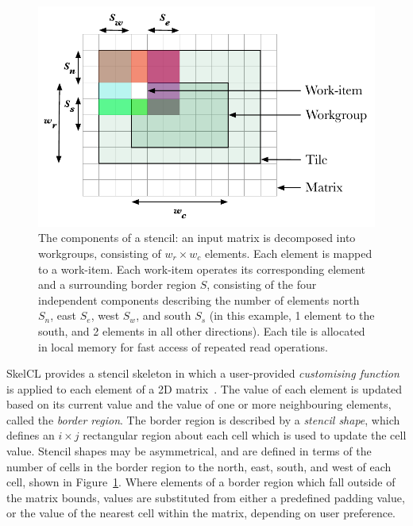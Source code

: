 \documentclass[nonatbib,preprint,10pt]{sigplanconf}
\begin{document}
\begin{figure}
\centering
\includegraphics[width=.75\columnwidth]{img/stencil}
\caption[Stencil border region]{%
  The components of a stencil: an input matrix is decomposed into
  workgroups, consisting of $w_r \times w_c$ elements. Each element is
  mapped to a work-item. Each work-item operates its corresponding
  element and a surrounding border region $S$, consisting of the four
  independent components describing the number of elements north
  $S_n$, east $S_e$, west $S_w$, and south $S_s$ (in this example, 1
  element to the south, and 2 elements in all other directions). Each
  tile is allocated in local memory for fast access of repeated read
  operations.%
}
\label{fig:stencil-shape}
\end{figure}

SkelCL provides a stencil skeleton in which a user-provided
\emph{customising function} is applied to each element of a 2D
matrix~\cite{Breuer2014a}. The value of each element is updated based
on its current value and the value of one or more neighbouring
elements, called the \emph{border region}. The border region is
described by a \emph{stencil shape}, which defines an $i \times j$
rectangular region about each cell which is used to update the cell
value. Stencil shapes may be asymmetrical, and are defined in terms of
the number of cells in the border region to the north, east, south,
and west of each cell, shown in Figure~\ref{fig:stencil-shape}. Where
elements of a border region which fall outside of the matrix bounds,
values are substituted from either a predefined padding value, or the
value of the nearest cell within the matrix, depending on user
preference.
\end{document}
